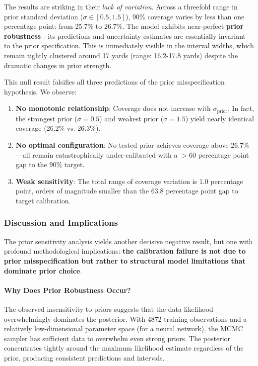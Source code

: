 The results are striking in their \textit{lack of variation}. Across a threefold range in prior standard deviation ($\sigma \in [0.5, 1.5]$), 90\% coverage varies by less than one percentage point: from 25.7\% to 26.7\%. The model exhibits near-perfect \textbf{prior robustness}—its predictions and uncertainty estimates are essentially invariant to the prior specification. This is immediately visible in the interval widths, which remain tightly clustered around 17 yards (range: 16.2-17.8 yards) despite the dramatic changes in prior strength.

This null result falsifies all three predictions of the prior misspecification hypothesis. We observe:

\begin{enumerate}
    \item \textbf{No monotonic relationship}: Coverage does not increase with $\sigma_{\text{prior}}$. In fact, the strongest prior ($\sigma = 0.5$) and weakest prior ($\sigma = 1.5$) yield nearly identical coverage (26.2\% vs. 26.3\%).

    \item \textbf{No optimal configuration}: No tested prior achieves coverage above 26.7\%—all remain catastrophically under-calibrated with a $>60$ percentage point gap to the 90\% target.

    \item \textbf{Weak sensitivity}: The total range of coverage variation is 1.0 percentage point, orders of magnitude smaller than the 63.8 percentage point gap to target calibration.
\end{enumerate}

\subsubsection{Discussion and Implications}

The prior sensitivity analysis yields another decisive negative result, but one with profound methodological implications: \textbf{the calibration failure is not due to prior misspecification but rather to structural model limitations that dominate prior choice}.

\paragraph{Why Does Prior Robustness Occur?}

The observed insensitivity to priors suggests that the data likelihood overwhelmingly dominates the posterior. With 4872 training observations and a relatively low-dimensional parameter space (for a neural network), the MCMC sampler has sufficient data to overwhelm even strong priors. The posterior concentrates tightly around the maximum likelihood estimate regardless of the prior, producing consistent predictions and intervals.

